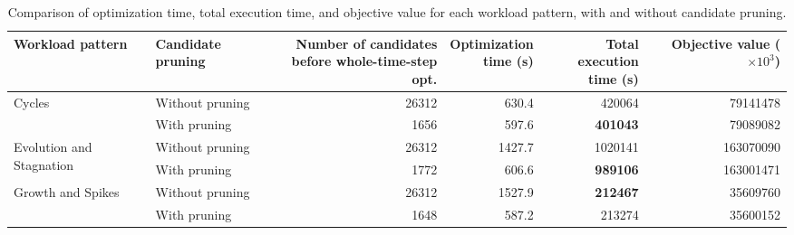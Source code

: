 \begin{table}[t]
\centering
\caption{Comparison of optimization time, total execution time, and objective value for each workload pattern, with and without candidate pruning.}
\label{table:ex3_1}
\begin{tabular}{llrrrr}
\toprule
Workload pattern & Candidate pruning & \shortstack{Number of candidates\\before whole-time-step opt.} & \shortstack{Optimization\\time (s)} & \shortstack{Total execution\\time (s)} & Objective value ($\times 10^{3}$) \\
\midrule
\multirow{2}{*}{Cycles} & Without pruning & 26312 & 630.4 & 420064 & 79141478 \\
\cmidrule(l){2-6}
 & With pruning & 1656 & 597.6 & \textbf{401043} & 79089082 \\
\midrule
\multirow{2}{*}{Evolution and Stagnation} & Without pruning & 26312 & 1427.7 & 1020141 & 163070090 \\
\cmidrule(l){2-6}
 & With pruning & 1772 & 606.6 & \textbf{989106} & 163001471 \\
\midrule
\multirow{2}{*}{Growth and Spikes} & Without pruning & 26312 & 1527.9 & \textbf{212467} & 35609760 \\
\cmidrule(l){2-6}
 & With pruning & 1648 & 587.2 & 213274 & 35600152 \\
\bottomrule
\end{tabular}
\end{table}
